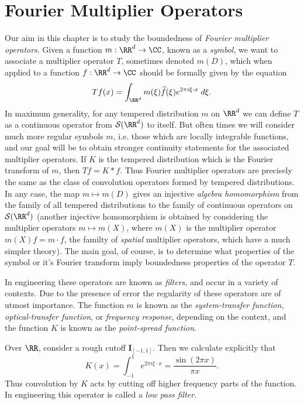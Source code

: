 \chapter{Fourier Multiplier Operators}

Our aim in this chapter is to study the boundedness of \emph{Fourier multiplier operators}. Given a function $m: \RR^d \to \CC$, known as a \emph{symbol}, we want to associate a multiplier operator $T$, sometimes denoted $m(D)$, which when applied to a function $f: \RR^d \to \CC$ should be formally given by the equation
%
\[ Tf(x) = \int_{\RR^d} m(\xi) \widehat{f}(\xi) e^{2 \pi i \xi \cdot x}\; d\xi. \]
%
In maximum generality, for any tempered distribution $m$ on $\RR^d$ we can define $T$ as a continuous operator from $\mathcal{S}(\RR^d)$ to itself. But often times we will consider much more regular symbols $m$, i.e. those which are locally integrable functions, and our goal will be to obtain stronger continuity statements for the associated multiplier operators. If $K$ is the tempered distribution which is the Fourier transform of $m$, then $Tf = K * f$. Thus Fourier multiplier operators are precisely the same as the class of convolution operators formed by tempered distributions. In any case, the map $m \mapsto m(D)$ gives an injective \emph{algebra homomorphism} from the family of all tempered distributions to the family of continuous operators on $\mathcal{S}(\RR^d)$ (another injective homomorphism is obtained by considering the multiplier operators $m \mapsto m(X)$, where $m(X)$ is the multiplier operator $m(X) f = m \cdot f$, the familty of \emph{spatial} multiplier operators, which have a much simpler theory). The main goal, of course, is to determine what properties of the symbol or it's Fourier transform imply boundedness properties of the operator $T$.

\begin{remark}
  In engineering these operators are known as \emph{filters}, and occur in a variety of contexts. Due to the presence of error the regularity of these operators are of utmost importance. The function $m$ is known as the \emph{system-transfer function}, \emph{optical-transfer function}, or \emph{frequency response}, depending on the context, and the function $K$ is known as the \emph{point-spread function}.
\end{remark}

\begin{example}
  Over $\RR$, consider a rough cutoff $\mathbf{I}_{[-1,1]}$. Then we calculate explicitly that
  \[ K(x) = \int_{-1}^1 e^{2 \pi i \xi \cdot x} = \frac{\sin(2 \pi x)}{\pi x}. \]
  Thus convolution by $K$ acts by cutting off higher frequency parts of the function. In engineering this operator is called a \emph{low pass filter}.
\end{example}

